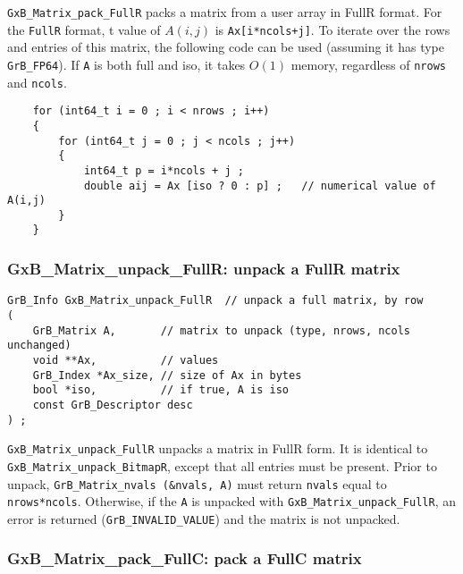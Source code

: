 \documentclass[12pt]{article}
\begin{document}
\verb'GxB_Matrix_pack_FullR' packs a matrix from a user array in FullR format.
For the \verb'FullR' format, t value of $A(i,j)$ is \verb'Ax[i*ncols+j]'.  To
iterate over the rows and entries of this matrix, the following code can be
used (assuming it has type \verb'GrB_FP64').  If \verb'A' is both full and iso,
it takes $O(1)$ memory, regardless of \verb'nrows' and \verb'ncols'.

    \vspace{-0.1in}
    {\footnotesize
    \begin{verbatim}
    for (int64_t i = 0 ; i < nrows ; i++)
    {
        for (int64_t j = 0 ; j < ncols ; j++)
        {
            int64_t p = i*ncols + j ;
            double aij = Ax [iso ? 0 : p] ;   // numerical value of A(i,j)
        }
    } \end{verbatim}}

\subsubsection{{\sf GxB\_Matrix\_unpack\_FullR:} unpack a FullR matrix}
\label{matrix_unpack_fullr}

\begin{mdframed}[userdefinedwidth=6in]
{\footnotesize
\begin{verbatim}
GrB_Info GxB_Matrix_unpack_FullR  // unpack a full matrix, by row
(
    GrB_Matrix A,       // matrix to unpack (type, nrows, ncols unchanged)
    void **Ax,          // values
    GrB_Index *Ax_size, // size of Ax in bytes
    bool *iso,          // if true, A is iso
    const GrB_Descriptor desc
) ;
\end{verbatim}
} \end{mdframed}

\verb'GxB_Matrix_unpack_FullR' unpacks a matrix in FullR form.  It is identical
to \verb'GxB_Matrix_unpack_BitmapR', except that all entries must be present.
Prior to unpack, \verb'GrB_Matrix_nvals (&nvals, A)' must return
\verb'nvals' equal to \verb'nrows*ncols'.  Otherwise, if the \verb'A' is
unpacked with \newline \verb'GxB_Matrix_unpack_FullR', an error is returned
(\verb'GrB_INVALID_VALUE') and the matrix is not unpacked.

\subsubsection{{\sf GxB\_Matrix\_pack\_FullC:} pack a FullC matrix}
\label{matrix_pack_fullc}
\end{document}

